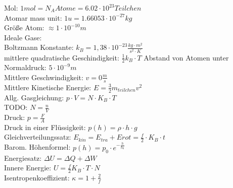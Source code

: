 \documentclass[A4]{scrreprt}
\begin{document}
    Mol: $1 mol = N_A Atome = 6.02\cdot 10^{23} Teilchen$\\
    Atomar mass unit: $1u = 1.66053 \cdot 10^{-27} kg$\\
    Größe Atom: $\approx 1\cdot 10^{-10} m$ \\
    Ideale Gase:\\
    Boltzmann Konstante: $k_B = 1,38 \cdot 10^{-23} \frac{kg \cdot m^2}{s^2 \cdot K}$\\
    mittlere quadratische Geschindigkeit: $\frac{1}{2} k_B \cdot T$
    Abstand von Atomen unter Normaldruck: $5\cdot 10^{-9} m$\\
    Mittlere Geschwindigkeit: $v = 0 \frac{m}{s}$\\
    Mittlere Kinetische Energie: $E = \frac{3}{2}m_{teilchen}v^2$\\
    Allg. Gasgleichung: $p\cdot V = N \cdot K_B \cdot T$\\
    TODO: $ N = \frac{n}{V}$\\
    Druck: $p = \frac{F}{A}$ \\
    Druck in einer Flüssigkeit: $p(h) = \rho \cdot h \cdot g$\\
    Gleichverteilungssatz: $E_{kin} = E_{tra} + E{rot} = \frac{f}{2} \cdot K_B \cdot t$\\
    Barom. Höhenformel: $p(h) = p_0 \cdot e^{-\frac{h}{h_0}}$\\
    Energiesatz: $\Delta U = \Delta Q + \Delta W$\\
    Innere Energie: $U = \frac{f}{2} K_B \cdot T \cdot N$\\
    Isentropenkoeffizient: $\kappa = 1+ \frac{2}{f}$
    \\ 
\end{document}

